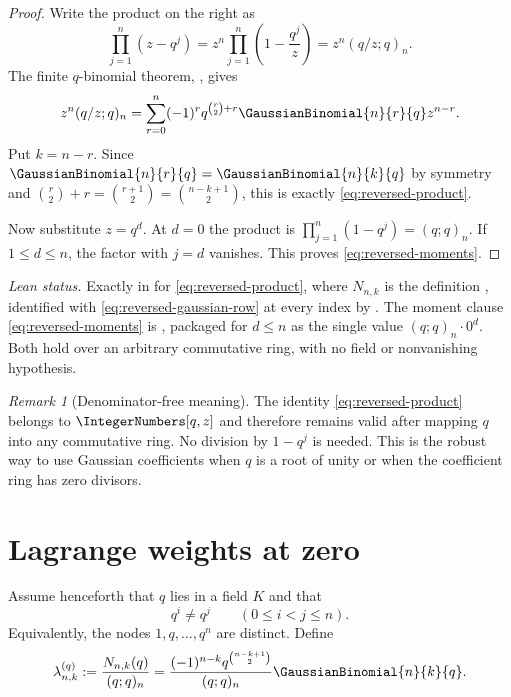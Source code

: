 \documentclass[11pt,a4paper,oneside,openany]{book}
\theoremstyle{definition}
\theoremstyle{remark}
\newtheorem{remark}[remark]{Remark}
\begin{document}
\begin{proof}
Write the product on the right as
\[
 \prod_{j=1}^{n}(z-q^j)
 =z^n\prod_{j=1}^{n}\left(1-\frac{q^j}{z}\right)
 =z^n(q/z;q)_n.
\]
The finite $q$-binomial theorem, , gives
\[
 z^n(q/z;q)_n
 =\sum_{r=0}^{n}(-1)^r q^{\binom r2+r}\GaussianBinomial{n}{r}{q} z^{n-r}.
\]
Put $k=n-r$.  Since $\GaussianBinomial{n}{r}{q}=\GaussianBinomial{n}{k}{q}$ by symmetry and
$\binom r2+r=\binom{r+1}{2}=\binom{n-k+1}{2}$, this is exactly
\eqref{eq:reversed-product}.

Now substitute $z=q^d$.  At $d=0$ the product is
$\prod_{j=1}^{n}(1-q^j)=(q;q)_n$.  If $1\le d\le n$, the factor with
$j=d$ vanishes.  This proves \eqref{eq:reversed-moments}.
\end{proof}
\emph{Lean status.}  Exactly  in  for \eqref{eq:reversed-product}, where \(N_{n,k}\) is the definition , identified with \eqref{eq:reversed-gaussian-row} at every index by .  The moment clause \eqref{eq:reversed-moments} is , packaged for \(d\le n\) as the single value \((q;q)_n\cdot 0^{d}\).  Both hold over an arbitrary commutative ring, with no field or nonvanishing hypothesis.


\begin{remark}[Denominator-free meaning]\label{rem:denominator-free-reversed}
The identity \eqref{eq:reversed-product} belongs to $\IntegerNumbers[q,z]$ and therefore remains valid after mapping $q$ into any commutative ring.  No division by $1-q^j$ is needed.  This is the robust way to use Gaussian coefficients when $q$ is a root of unity or when the coefficient ring has zero divisors.
\end{remark}

\section{Lagrange weights at zero}

Assume henceforth that $q$ lies in a field $K$ and that
\[
 q^i\ne q^j\qquad(0\le i<j\le n).
\]
Equivalently, the nodes $1,q,\ldots,q^n$ are distinct.  Define
\begin{equation}\label{eq:geometric-lagrange-weight}
 \lambda_{n,k}^{(q)}
 :=\frac{N_{n,k}(q)}{(q;q)_n}
 =\frac{(-1)^{n-k}q^{\binom{n-k+1}{2}}}{(q;q)_n}\GaussianBinomial{n}{k}{q}.
\end{equation}
\end{document}
